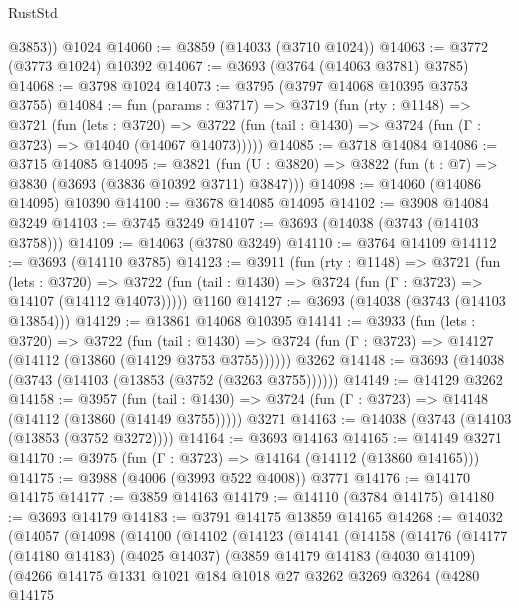 \begin{lexlean}{RustStd}
\begin{coremodule}
        @3853))
    @1024
@14060 := @3859 (@14033 (@3710 @1024))
@14063 := @3772 (@3773 @1024) @10392
@14067 := @3693 (@3764 (@14063 @3781) @3785)
@14068 := @3798 @1024
@14073 := @3795 (@3797 @14068 @10395 @3753 @3755)
@14084 := fun (params : @3717) =>
  @3719
    (fun (rty : @1148) =>
    @3721
      (fun (lets : @3720) =>
      @3722 (fun (tail : @1430) => @3724 (fun (Γ : @3723) => @14040 (@14067 @14073)))))
@14085 := @3718 @14084
@14086 := @3715 @14085
@14095 := @3821
    (fun (U : @3820) => @3822 (fun (t : @7) => @3830 (@3693 (@3836 @10392 @3711) @3847)))
@14098 := @14060 (@14086 @14095) @10390
@14100 := @3678 @14085 @14095
@14102 := @3908 @14084 @3249
@14103 := @3745 @3249
@14107 := @3693 (@14038 (@3743 (@14103 @3758)))
@14109 := @14063 (@3780 @3249)
@14110 := @3764 @14109
@14112 := @3693 (@14110 @3785)
@14123 := @3911
    (fun (rty : @1148) =>
    @3721
      (fun (lets : @3720) =>
      @3722 (fun (tail : @1430) => @3724 (fun (Γ : @3723) => @14107 (@14112 @14073)))))
    @1160
@14127 := @3693 (@14038 (@3743 (@14103 @13854)))
@14129 := @13861 @14068 @10395
@14141 := @3933
    (fun (lets : @3720) =>
    @3722
      (fun (tail : @1430) =>
      @3724 (fun (Γ : @3723) => @14127 (@14112 (@13860 (@14129 @3753 @3755))))))
    @3262
@14148 := @3693 (@14038 (@3743 (@14103 (@13853 (@3752 (@3263 @3755))))))
@14149 := @14129 @3262
@14158 := @3957
    (fun (tail : @1430) => @3724 (fun (Γ : @3723) => @14148 (@14112 (@13860 (@14149 @3755)))))
    @3271
@14163 := @14038 (@3743 (@14103 (@13853 (@3752 @3272))))
@14164 := @3693 @14163
@14165 := @14149 @3271
@14170 := @3975 (fun (Γ : @3723) => @14164 (@14112 (@13860 @14165)))
@14175 := @3988 (@4006 (@3993 @522 @4008)) @3771
@14176 := @14170 @14175
@14177 := @3859 @14163
@14179 := @14110 (@3784 @14175)
@14180 := @3693 @14179
@14183 := @3791 @14175 @13859 @14165
@14268 := @14032
    (@14057
      (@14098
        (@14100
          (@14102
            (@14123
              (@14141
                (@14158
                  (@14176
                    (@14177
                      (@14180 @14183)
                      (@4025 @14037)
                      (@3859
                        @14179
                        @14183
                        (@4030 @14109)
                        (@4266
                          @14175
                          @1331
                          @1021
                          @184
                          @1018
                          @27
                          @3262
                          @3269
                          @3264
                          (@4280
                            @14175

\end{coremodule}
\end{lexlean}
